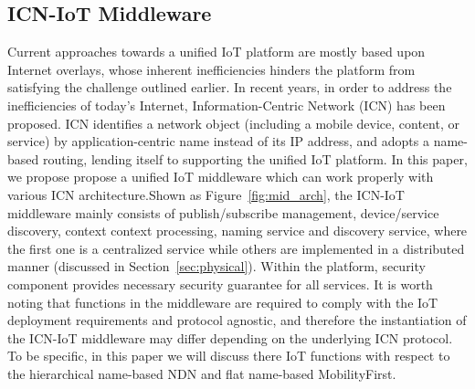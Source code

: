 \subsection{ICN-IoT Middleware}
Current approaches towards a unified IoT platform are mostly based upon Internet overlays, whose inherent inefficiencies hinders the platform from satisfying the challenge outlined earlier. In recent years, in order to address  the inefficiencies of today's Internet, Information-Centric Network (ICN) has been proposed. ICN identifies a network object (including a mobile device, content, or service) by application-centric name instead of its IP address, and adopts a name-based routing, lending itself to supporting the unified IoT platform. In this paper, we propose propose a unified IoT middleware which can work properly with various ICN architecture.Shown as Figure~\ref{fig:mid_arch}, the ICN-IoT middleware mainly consists of publish/subscribe management, device/service discovery, context context processing, naming service and discovery service, where the first one is a centralized service while others are implemented in a distributed manner (discussed in Section~\ref{sec:physical}). Within the platform, security component provides necessary security guarantee for all services. It is worth noting that functions in the middleware are required to comply with the IoT deployment requirements and protocol agnostic, and therefore the instantiation of the ICN-IoT middleware may differ depending on the underlying ICN protocol. To be specific, in this paper we will discuss there IoT functions with respect to the hierarchical name-based NDN and flat name-based MobilityFirst. 
